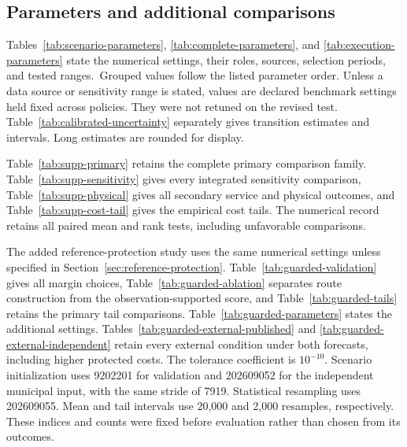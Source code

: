 \subsection{Parameters and additional comparisons}
\suppressfloats[t]

\label{app:parameters}

Tables~\ref{tab:scenario-parameters}, \ref{tab:complete-parameters}, and \ref{tab:execution-parameters} state the numerical settings, their roles, sources, selection periods, and tested ranges.\AITextRef\ Grouped values follow the listed parameter order. Unless a data source or sensitivity range is stated, values are declared benchmark settings held fixed across policies. They were not retuned on the revised test. Table~\ref{tab:calibrated-uncertainty} separately gives transition estimates and intervals. Long estimates are rounded for display.

Table~\ref{tab:supp-primary} retains the complete primary comparison family. Table~\ref{tab:supp-sensitivity} gives every integrated sensitivity comparison, Table~\ref{tab:supp-physical} gives all secondary service and physical outcomes, and Table~\ref{tab:supp-cost-tail} gives the empirical cost tails. The numerical record retains all paired mean and rank tests, including unfavorable comparisons.

The added reference-protection study uses the same numerical settings unless
specified in Section~\ref{sec:reference-protection}.
Table~\ref{tab:guarded-validation} gives all margin choices,
Table~\ref{tab:guarded-ablation} separates route construction from the
observation-supported score, and Table~\ref{tab:guarded-tails} retains the
primary tail comparisons. Table~\ref{tab:guarded-parameters} states the
additional settings. Tables~\ref{tab:guarded-external-published} and
\ref{tab:guarded-external-independent} retain every external condition
under both forecasts, including higher protected costs.
The tolerance coefficient is $10^{-10}$.
Scenario initialization uses 9202201 for validation and 202609052 for the
independent municipal input, with the same stride of 7919. Statistical
resampling uses 202609055. Mean and tail intervals use 20,000 and 2,000
resamples, respectively. These indices and counts were fixed before
evaluation rather than chosen from its outcomes.







